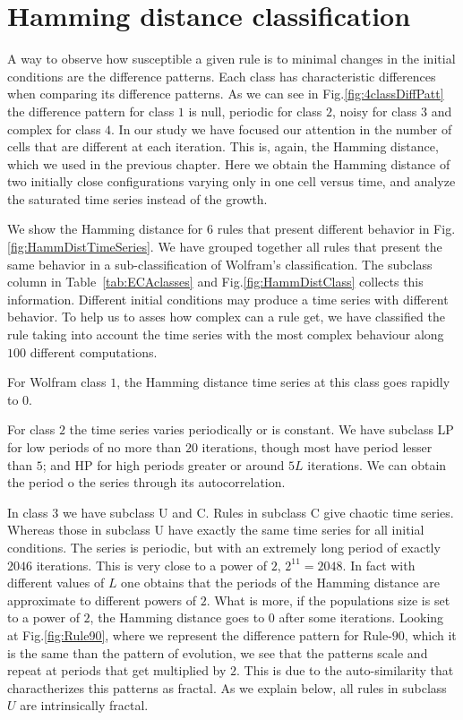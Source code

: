 \section{Hamming distance classification}

A way to observe how susceptible a given rule is to minimal changes in the initial conditions are the difference patterns. Each class has characteristic differences when comparing its difference patterns. As we can see in Fig.\ref{fig:4classDiffPatt} the difference pattern for class $1$ is null, periodic for class $2$, noisy for class $3$ and complex for class $4$. In our study we have focused our attention in the number of cells that are different at each iteration. This is, again, the Hamming distance, which we used in the previous chapter. Here we obtain the Hamming distance of two initially close configurations varying only in one cell versus time, and analyze the saturated time series instead of the growth. 


We show the Hamming distance for $6$ rules that present different behavior in Fig.\ref{fig:HammDistTimeSeries}. We have grouped together all rules that present the same behavior in a sub-classification of Wolfram's classification. The subclass column in Table~\ref{tab:ECAclasses} and Fig.\ref{fig:HammDistClass} collects this information. Different initial conditions may produce a time series with different behavior. To help us to asses how complex can a rule get, we have classified the rule taking into account the time series with the most complex behaviour along $100$ different computations.

For Wolfram class $1$, the Hamming distance time series at this class goes rapidly to $0$. 

For class $2$ the time series varies periodically or is constant. We have subclass LP for low periods of no more than $20$ iterations, though most have period lesser than $5$; and HP for high periods greater or around $5L$ iterations. We can obtain the period o the series through its autocorrelation.

In class $3$ we have subclass U and C. Rules in subclass C give chaotic time series. Whereas those in subclass U have exactly the same time series for all initial conditions. The series is periodic, but with an extremely long period of exactly $2046$ iterations. This is very close to a power of $2$, $2^11 = 2048$. In fact with different values of $L$ one obtains that the periods of the Hamming distance are approximate to different powers of $2$. What is more, if the populations size is set to a power of $2$, the Hamming distance goes to $0$ after some iterations. Looking at Fig.\ref{fig:Rule90}, where we represent the difference pattern for Rule-$90$, which it is the same than the pattern of evolution, we see that the patterns scale and repeat at periods that get multiplied by $2$. This is due to the auto-similarity that charactherizes this patterns as fractal.
As we explain below, all rules in subclass $U$ are intrinsically fractal.




